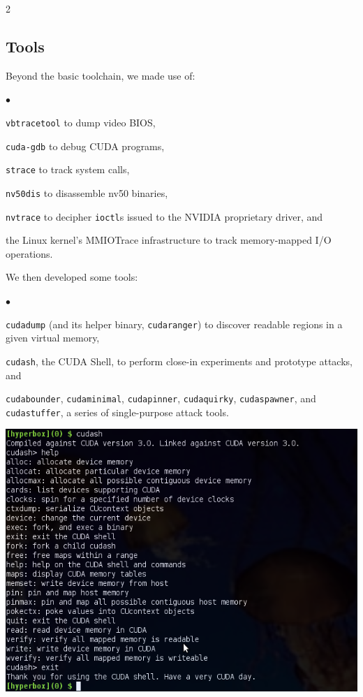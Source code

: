 \documentclass[letterpaper,10pt]{article}
\makeatletter
\newcommand{\squishlist}{\begin{list}{$\bullet$}
  {\setlength{\itemsep}{0pt}
    \setlength{\parsep}{3pt}
    \setlength{\topsep}{3pt}
    \setlength{\partopsep}{0pt}
    \setlength{\leftmargin}{1.5em}
    \setlength{\labelwidth}{1em}
    \setlength{\labelsep}{0.5em}
  } }
\newcommand{\squishend}{\end{list}}
\newenvironment{figurehere}
{\def\@captype{figure}}
{}
\makeatother
\begin{document}
\begin{multicols}{2}
\subsection{Tools}
Beyond the basic toolchain, we made use of:
\squishlist
\item \texttt{vbtracetool}\cite{vbtrace} to dump video BIOS,
\item \texttt{cuda-gdb}\cite{cudagdb} to debug CUDA programs,
\item \texttt{strace}\cite{stracecode} to track system calls,
\item \texttt{nv50dis}\cite{nv50dis} to disassemble nv50 binaries,
\item \texttt{nvtrace}\cite{nvtrace} to decipher \texttt{ioctl}s issued to the NVIDIA proprietary driver, and
\item the Linux kernel's MMIOTrace\cite{mmiotrace} infrastructure to track memory-mapped I/O operations.
\squishend
We then developed some tools:
\squishlist
\item \texttt{cudadump} (and its helper binary, \texttt{cudaranger}) to
discover readable regions in a given virtual memory,
\item \texttt{cudash}, the CUDA Shell, to perform close-in experiments and
prototype attacks, and
\item \texttt{cudabounder}, \texttt{cudaminimal}, \texttt{cudapinner}, \texttt{cudaquirky}, \texttt{cudaspawner}, and \texttt{cudastuffer}, a series of single-purpose attack tools.
\squishend
\vfill
\begin{figurehere}
\centering
\includegraphics[width=\columnwidth]{texobjs/cudash-help.png}
\end{figurehere}

\end{multicols}
\end{document}
